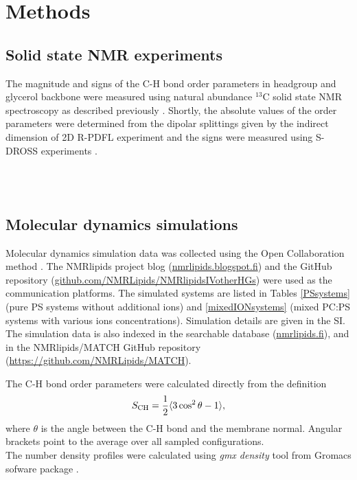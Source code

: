 \documentclass[aps,prl,superscriptaddress,twocolumn]{revtex4}
\begin{document}
\section{Methods}

\subsection{Solid state NMR experiments}
The magnitude and signs of the C-H bond order parameters in
headgroup and glycerol backbone were measured
using natural abundance $^{13}$C solid state NMR spectroscopy as
described previously \cite{ferreira13,ferreira16}.
Shortly, the absolute values of the order parameters were determined from the dipolar splittings
given by the indirect dimension of 2D R-PDFL experiment \cite{dvinskikh04} and
the signs were measured using S-DROSS experiments \cite{gross97}.

 \\
 \\



\subsection{Molecular dynamics simulations}
Molecular dynamics simulation data was collected using
the Open Collaboration method \cite{botan15}.
The NMRlipids project blog (\url{nmrlipids.blogspot.fi}) and
the GitHub repository (\url{github.com/NMRLipids/NMRlipidsIVotherHGs})
were used as the communication platforms.
The simulated systems are listed in 
Tables \ref{PSsystems} (pure PS systems without additional ions) 
and \ref{mixedIONsystems} (mixed PC:PS systems with various ions concentrations).
Simulation details are given in the SI.
The simulation data is also indexed in the
searchable database (\url{nmrlipids.fi}),
and in the NMRlipids/MATCH GitHub repository (\url{https://github.com/NMRLipids/MATCH}).

The C-H bond order parameters were calculated directly
from the definition
\begin{equation}
S_{\rm CH}=\frac{1}{2}\langle 3\cos^2\theta -1 \rangle,
\end{equation}
where $\theta$ is the angle between the C-H bond and the membrane normal.
Angular brackets point to the average over all sampled configurations.
\\
The number density profiles were calculated using {\it gmx density} tool
from Gromacs sofware package \cite{gromacsMANUAL}.
\end{document}
